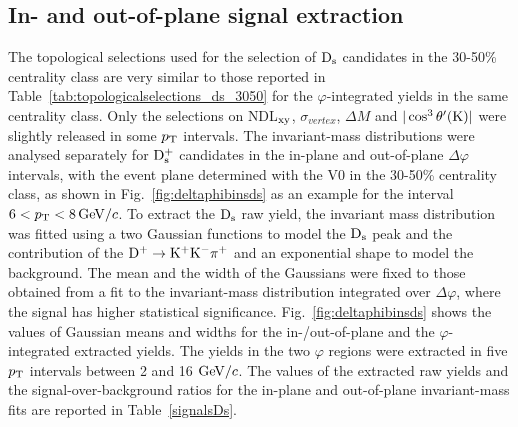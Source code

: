  \subsection{In- and out-of-plane signal extraction}
 \label{sec:SigExtracV2}
 The topological selections used for the selection of ${\rm D_s}$ candidates in the 30-50\% centrality class
 are very similar to those reported in Table~\ref{tab:topologicalselections_ds_3050} for the
 $\varphi$-integrated yields in the same centrality class.
 Only the selections on NDL$_{\rm xy}$, $\sigma_{vertex}$, $\Delta M$ 
 and $|\cos^3 \theta^\prime({\rm K})|$ were slightly released in some $p_{\rm T}$
 intervals. The invariant-mass distributions were analysed separately for ${\rm D_s^+}$ candidates
 in the in-plane and out-of-plane $\Delta \varphi$ intervals, 
with the event plane determined with the V0 
in the 30-50\% centrality class, as shown in Fig.~\ref{fig:deltaphibinsds} 
as an example for the interval $6 < p_{\rm T} < 8 \, \mathrm{GeV}/c$.
To extract the ${\rm D_s}$ raw yield, the invariant mass distribution was fitted using a two Gaussian
functions to model the ${\rm D_s}$ peak and the contribution of the ${\rm D^{+}\to K^+ K^-\pi^+}$ and 
an exponential shape to model the background.
The mean and the width of the Gaussians were fixed to those obtained from a fit to
the invariant-mass distribution integrated over $\Delta \varphi$, 
where the signal has higher statistical significance. 
Fig.~\ref{fig:deltaphibinsds} shows the values of Gaussian means and 
widths for the in-/out-of-plane and the $\varphi$-integrated extracted yields.
The yields in the two $\varphi$ regions were extracted in five $p_{\rm T}$ 
intervals between 2 and 16 $\mathrm{GeV}/c$.
The values of the extracted raw yields and the signal-over-background 
ratios for the in-plane and out-of-plane invariant-mass fits 
are reported in Table~\ref{signalsDs}.

